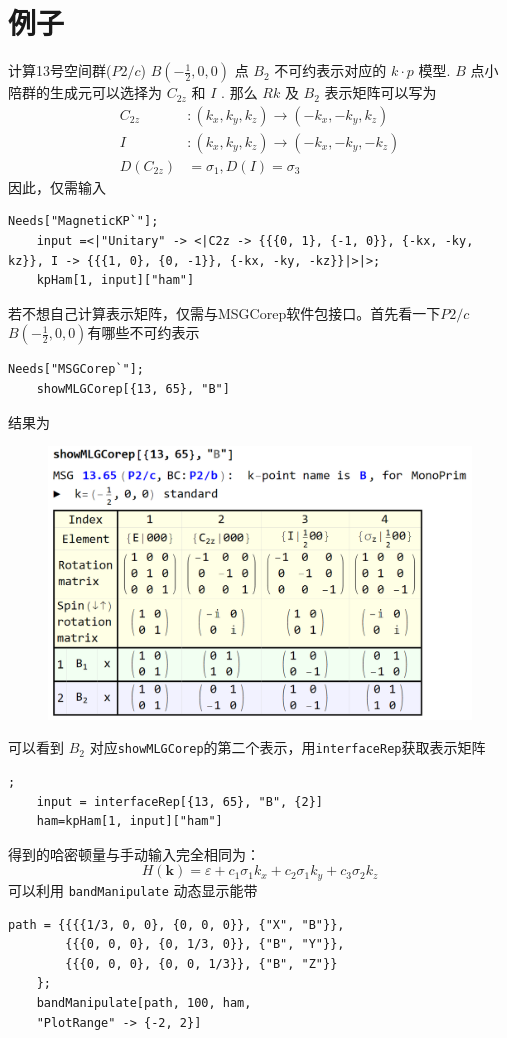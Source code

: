 \documentclass[titlepage,a4paper,12pt,AutoFakeBold]{article}
\begin{document}
\section{例子}
计算13号空间群($P2/c$) $\ensuremath{B(-\frac{1}{2},0,0)}$ 点 $B_{2}$ 不可约表示对应的 $k\cdot p$ 模型.
$B$ 点小陪群的生成元可以选择为 $C_{2z}$ 和 $I$ . 那么 $Rk$ 及 $B_{2}$ 表示矩阵可以写为
\begin{align*}
	C_{2z} & :(k_{x},k_{y},k_{z})\rightarrow(-k_{x},-k_{y},k_{z})\\
	I & :(k_{x},k_{y},k_{z})\rightarrow(-k_{x},-k_{y},-k_{z})\\
	D(C_{2z}) & =\sigma_{1},D(I)=\sigma_{3}
\end{align*}
因此，仅需输入
\begin{lstlisting}[backgroundcolor={\color{yellow!5!white}},mathescape=true]
	Needs["MagneticKP`"];
	input =<|"Unitary" -> <|C2z -> {{{0, 1}, {-1, 0}}, {-kx, -ky, kz}}, I -> {{{1, 0}, {0, -1}}, {-kx, -ky, -kz}}|>|>;
	kpHam[1, input]["ham"]
\end{lstlisting}
若不想自己计算表示矩阵，仅需与\textsf{MSGCorep}软件包接口。首先看一下$P2/c$ $\ensuremath{B(-\frac{1}{2},0,0)}$有哪些不可约表示
\begin{lstlisting}[backgroundcolor={\color{yellow!5!white}},mathescape=true]
	Needs["MSGCorep`"];
	showMLGCorep[{13, 65}, "B"]
\end{lstlisting}
结果为
\begin{figure}[H]
	\centering
	\includegraphics[width=.5\textwidth]{./figures/showcorep}
\end{figure}
可以看到 $B_2$ 对应\lstinline|showMLGCorep|的第二个表示，用\lstinline|interfaceRep|获取表示矩阵
\begin{lstlisting}[backgroundcolor={\color{yellow!5!white}},mathescape=true];
	input = interfaceRep[{13, 65}, "B", {2}]
	ham=kpHam[1, input]["ham"]
\end{lstlisting}
得到的哈密顿量与手动输入完全相同为：
\[
H(\boldsymbol{k})=\varepsilon+c_{1}\sigma_{1}k_{x}+c_{2}\sigma_{1}k_{y}+c_{3}\sigma_{2}k_{z}
\]
可以利用 \lstinline|bandManipulate| 动态显示能带
\begin{lstlisting}[backgroundcolor={\color{yellow!5!white}},mathescape=true]
	path = {{{{1/3, 0, 0}, {0, 0, 0}}, {"X", "B"}},
		{{{0, 0, 0}, {0, 1/3, 0}}, {"B", "Y"}},
		{{{0, 0, 0}, {0, 0, 1/3}}, {"B", "Z"}}
	};
	bandManipulate[path, 100, ham, 
	"PlotRange" -> {-2, 2}]
\end{lstlisting}
\end{document}
